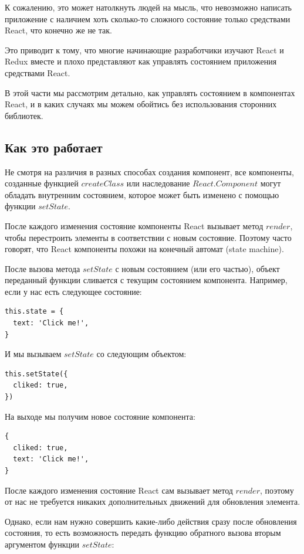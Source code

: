 К сожалению, это может натолкнуть людей на мысль, что невозможно написать приложение с наличием хоть сколько-то сложного состояние только средствами React, что конечно же не так.

Это приводит к тому, что многие начинающие разработчики изучают React и Redux вместе и плохо представляют как управлять состоянием приложения средствами React.

В этой части мы рассмотрим детально, как управлять состоянием в компонентах React, и в каких случаях мы можем обойтись без использования сторонних библиотек.

\subsection{Как это работает}

Не смотря на различия в разных способах создания компонент, все компоненты, созданные функцией $createClass$ или наследование $React.Component$ могут обладать внутренним состоянием, которое может быть изменено с помощью функции $setState$.

После каждого изменения состояние компоненты React вызывает метод $render$, чтобы перестроить элементы в соответствии с новым состояние. 
Поэтому часто говорят, что React компоненты похожи на конечный автомат (state machine).

После вызова метода $setState$ с новым состоянием (или его частью), объект переданный функции сливается с текущим состоянием компонента. Например, если у нас есть следующее состояние:

\begin{lstlisting}
this.state = {
  text: 'Click me!',
}
\end{lstlisting}

И мы вызываем $setState$ со следующим объектом:

\begin{lstlisting}
this.setState({
  cliked: true,
})
\end{lstlisting}

На выходе мы получим новое состояние компонента:

\begin{lstlisting}
{
  cliked: true,
  text: 'Click me!',
}
\end{lstlisting}

После каждого изменения состояние React сам вызывает метод $render$, поэтому от нас не требуется никаких дополнительных движений для обновления элемента.

Однако, если нам нужно совершить какие-либо действия сразу после обновления состояния, то есть возможность передать функцию обратного вызова вторым аргументом функции $setState$:

